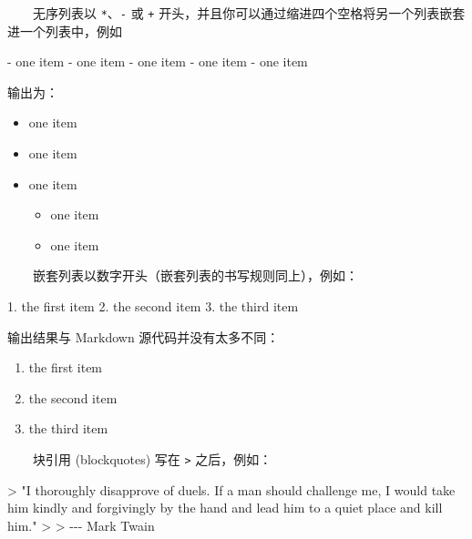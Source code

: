 \documentclass[
  12pt,
]{krantz}
\newenvironment{Shaded}{\begin{snugshade}}{\end{snugshade}}
\newcommand{\AttributeTok}[1]{\textcolor[rgb]{0.13,0.29,0.53}{#1}}
\newcommand{\NormalTok}[1]{#1}
\newcommand{\SpecialStringTok}[1]{\textcolor[rgb]{0.31,0.60,0.02}{#1}}
\providecommand{\tightlist}{%
  \setlength{\itemsep}{0pt}\setlength{\parskip}{0pt}}
\theoremstyle{definition}
\theoremstyle{definition}
\theoremstyle{definition}
\theoremstyle{definition}
\theoremstyle{remark}
\begin{document}
  无序列表以 \texttt{*}、\texttt{-} 或 \texttt{+} 开头，并且你可以通过缩进四个空格将另一个列表嵌套进一个列表中，例如

\begin{Shaded}
\begin{Highlighting}[]
\SpecialStringTok{{-} }\NormalTok{one item}
\SpecialStringTok{{-} }\NormalTok{one item}
\SpecialStringTok{{-} }\NormalTok{one item}
\SpecialStringTok{    {-} }\NormalTok{one item}
\SpecialStringTok{    {-} }\NormalTok{one item}
\end{Highlighting}
\end{Shaded}

输出为：

\begin{itemize}
\tightlist
\item
  one item
\item
  one item
\item
  one item

  \begin{itemize}
  \tightlist
  \item
    one item
  \item
    one item
  \end{itemize}
\end{itemize}

  嵌套列表以数字开头（嵌套列表的书写规则同上），例如：

\begin{Shaded}
\begin{Highlighting}[]
\SpecialStringTok{1. }\NormalTok{the first item}
\SpecialStringTok{2. }\NormalTok{the second item}
\SpecialStringTok{3. }\NormalTok{the third item}
\end{Highlighting}
\end{Shaded}

输出结果与 Markdown 源代码并没有太多不同：

\begin{enumerate}
\def\labelenumi{\arabic{enumi}.}
\tightlist
\item
  the first item
\item
  the second item
\item
  the third item
\end{enumerate}

  块引用 (blockquotes) 写在 \texttt{\textgreater{}} 之后，例如：

\begin{Shaded}
\begin{Highlighting}[]
\AttributeTok{\textgreater{} "I thoroughly disapprove of duels. If a man should challenge me,}
\AttributeTok{  I would take him kindly and forgivingly by the hand and lead him}
\AttributeTok{  to a quiet place and kill him."}
\AttributeTok{\textgreater{}}
\AttributeTok{\textgreater{} {-}{-}{-} Mark Twain}
\end{Highlighting}
\end{Shaded}
\end{document}
